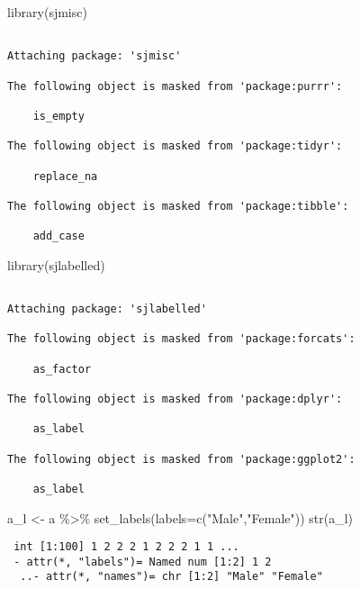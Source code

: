 \documentclass[
  letterpaper,
  DIV=11,
  numbers=noendperiod]{scrreprt}
\newenvironment{Shaded}{\begin{snugshade}}{\end{snugshade}}
\newcommand{\AttributeTok}[1]{\textcolor[rgb]{0.40,0.45,0.13}{#1}}
\newcommand{\FunctionTok}[1]{\textcolor[rgb]{0.28,0.35,0.67}{#1}}
\newcommand{\NormalTok}[1]{\textcolor[rgb]{0.00,0.23,0.31}{#1}}
\newcommand{\OtherTok}[1]{\textcolor[rgb]{0.00,0.23,0.31}{#1}}
\newcommand{\SpecialCharTok}[1]{\textcolor[rgb]{0.37,0.37,0.37}{#1}}
\newcommand{\StringTok}[1]{\textcolor[rgb]{0.13,0.47,0.30}{#1}}
\begin{document}
\begin{Shaded}
\begin{Highlighting}[]
\FunctionTok{library}\NormalTok{(sjmisc)}
\end{Highlighting}
\end{Shaded}

\begin{verbatim}

Attaching package: 'sjmisc'

The following object is masked from 'package:purrr':

    is_empty

The following object is masked from 'package:tidyr':

    replace_na

The following object is masked from 'package:tibble':

    add_case
\end{verbatim}

\begin{Shaded}
\begin{Highlighting}[]
\FunctionTok{library}\NormalTok{(sjlabelled)}
\end{Highlighting}
\end{Shaded}

\begin{verbatim}

Attaching package: 'sjlabelled'

The following object is masked from 'package:forcats':

    as_factor

The following object is masked from 'package:dplyr':

    as_label

The following object is masked from 'package:ggplot2':

    as_label
\end{verbatim}

\begin{Shaded}
\begin{Highlighting}[]
\NormalTok{a\_l }\OtherTok{\textless{}{-}}\NormalTok{ a }\SpecialCharTok{\%\textgreater{}\%}
  \FunctionTok{set\_labels}\NormalTok{(}\AttributeTok{labels=}\FunctionTok{c}\NormalTok{(}\StringTok{"Male"}\NormalTok{,}\StringTok{"Female"}\NormalTok{))}
\FunctionTok{str}\NormalTok{(a\_l)}
\end{Highlighting}
\end{Shaded}

\begin{verbatim}
 int [1:100] 1 2 2 2 1 2 2 2 1 1 ...
 - attr(*, "labels")= Named num [1:2] 1 2
  ..- attr(*, "names")= chr [1:2] "Male" "Female"
\end{verbatim}
\end{document}
